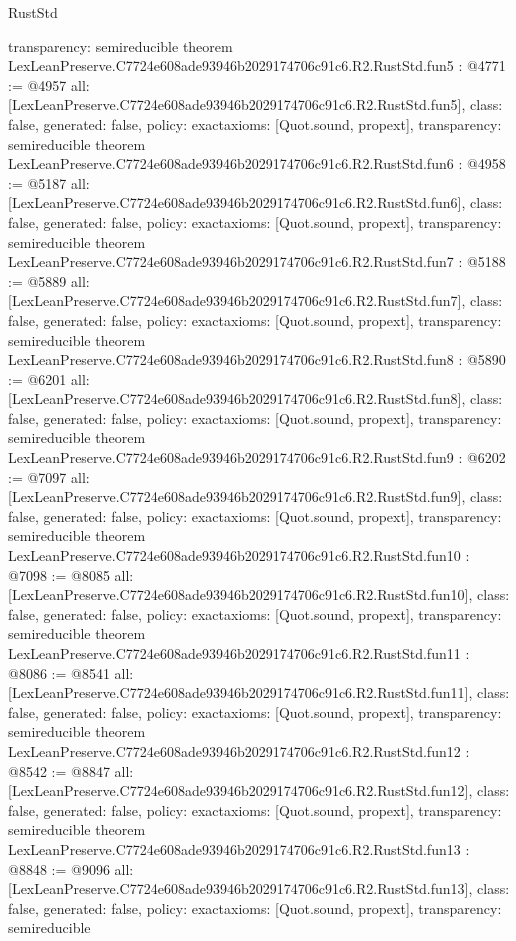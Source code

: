 \begin{lexlean}{RustStd}
\begin{coremodule}
{  transparency: semireducible
}
theorem LexLeanPreserve.C7724e608ade93946b2029174706c91c6.R2.RustStd.fun5 : @4771 := @4957 {
  all: [LexLeanPreserve.C7724e608ade93946b2029174706c91c6.R2.RustStd.fun5],
  class: false,
  generated: false,
  policy: exact{axioms: [Quot.sound, propext]},
  transparency: semireducible
}
theorem LexLeanPreserve.C7724e608ade93946b2029174706c91c6.R2.RustStd.fun6 : @4958 := @5187 {
  all: [LexLeanPreserve.C7724e608ade93946b2029174706c91c6.R2.RustStd.fun6],
  class: false,
  generated: false,
  policy: exact{axioms: [Quot.sound, propext]},
  transparency: semireducible
}
theorem LexLeanPreserve.C7724e608ade93946b2029174706c91c6.R2.RustStd.fun7 : @5188 := @5889 {
  all: [LexLeanPreserve.C7724e608ade93946b2029174706c91c6.R2.RustStd.fun7],
  class: false,
  generated: false,
  policy: exact{axioms: [Quot.sound, propext]},
  transparency: semireducible
}
theorem LexLeanPreserve.C7724e608ade93946b2029174706c91c6.R2.RustStd.fun8 : @5890 := @6201 {
  all: [LexLeanPreserve.C7724e608ade93946b2029174706c91c6.R2.RustStd.fun8],
  class: false,
  generated: false,
  policy: exact{axioms: [Quot.sound, propext]},
  transparency: semireducible
}
theorem LexLeanPreserve.C7724e608ade93946b2029174706c91c6.R2.RustStd.fun9 : @6202 := @7097 {
  all: [LexLeanPreserve.C7724e608ade93946b2029174706c91c6.R2.RustStd.fun9],
  class: false,
  generated: false,
  policy: exact{axioms: [Quot.sound, propext]},
  transparency: semireducible
}
theorem LexLeanPreserve.C7724e608ade93946b2029174706c91c6.R2.RustStd.fun10 : @7098 := @8085 {
  all: [LexLeanPreserve.C7724e608ade93946b2029174706c91c6.R2.RustStd.fun10],
  class: false,
  generated: false,
  policy: exact{axioms: [Quot.sound, propext]},
  transparency: semireducible
}
theorem LexLeanPreserve.C7724e608ade93946b2029174706c91c6.R2.RustStd.fun11 : @8086 := @8541 {
  all: [LexLeanPreserve.C7724e608ade93946b2029174706c91c6.R2.RustStd.fun11],
  class: false,
  generated: false,
  policy: exact{axioms: [Quot.sound, propext]},
  transparency: semireducible
}
theorem LexLeanPreserve.C7724e608ade93946b2029174706c91c6.R2.RustStd.fun12 : @8542 := @8847 {
  all: [LexLeanPreserve.C7724e608ade93946b2029174706c91c6.R2.RustStd.fun12],
  class: false,
  generated: false,
  policy: exact{axioms: [Quot.sound, propext]},
  transparency: semireducible
}
theorem LexLeanPreserve.C7724e608ade93946b2029174706c91c6.R2.RustStd.fun13 : @8848 := @9096 {
  all: [LexLeanPreserve.C7724e608ade93946b2029174706c91c6.R2.RustStd.fun13],
  class: false,
  generated: false,
  policy: exact{axioms: [Quot.sound, propext]},
  transparency: semireducible
}
\end{coremodule}
\end{lexlean}
